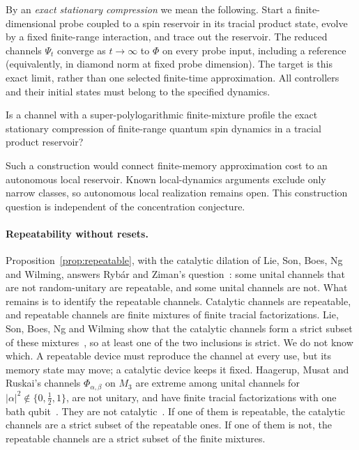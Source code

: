 By an \emph{exact stationary compression} we mean the following.
Start a finite-dimensional probe coupled to a spin reservoir in
its tracial product state, evolve by a fixed finite-range
interaction, and trace out the reservoir. The reduced channels
$\Psi_t$ converge as $t\to\infty$ to $\Phi$ on every probe input,
including a reference (equivalently, in diamond norm at fixed
probe dimension). The target is this exact limit, rather than
one selected finite-time approximation. All controllers and
their initial states must belong to the specified dynamics.

\begin{problem}\label{prob:local-limit}
Is a channel with a super-polylogarithmic finite-mixture profile the
exact stationary compression of finite-range quantum spin dynamics
in a tracial product reservoir?
\end{problem}

Such a construction would connect finite-memory approximation cost to
an autonomous local reservoir. Known local-dynamics arguments exclude
only narrow classes, so autonomous local realization remains open.
This construction question is independent of the concentration conjecture.

\paragraph{Repeatability without resets.}
Proposition~\ref{prop:repeatable}, with the catalytic dilation of Lie,
Son, Boes, Ng and Wilming, answers Ryb\'ar and Ziman's
question~\cite{RybarZiman2008}: some unital channels that are not
random-unitary are repeatable, and some unital channels are not. What
remains is to identify the repeatable channels. Catalytic channels are
repeatable, and repeatable channels are finite mixtures of finite
tracial factorizations. Lie, Son, Boes, Ng and Wilming show that the
catalytic channels form a strict subset of these
mixtures~\cite[Appendix~C]{LieSonBoesNgWilming2026}, so at least one of
the two inclusions is strict. We do not know which. A repeatable device
must reproduce the channel at every use, but its memory state may move;
a catalytic device keeps it fixed. Haagerup, Musat and Ruskai's channels $\Phi_{\alpha,\beta}$ on $M_3$ are
extreme among unital channels for $|\alpha|^2\notin\{0,\frac12,1\}$, are
not unitary, and have finite tracial factorizations with one bath
qubit~\cite{HaagerupMusatRuskai2021}. They are not
catalytic~\cite[Appendix~C]{LieSonBoesNgWilming2026}. If one of them is
repeatable, the catalytic channels are a strict subset of the repeatable
ones. If one of them is not, the repeatable channels are a strict subset
of the finite mixtures.

